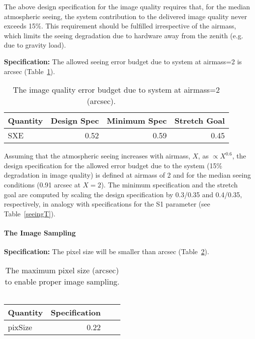 The above design specification for the image quality
requires that, for the median atmospheric seeing, the system
contribution to the delivered image quality never exceeds 15\%.
This requirement should be fulfilled irrespective of the airmass,
which limits the seeing degradation due to hardware away from the
zenith (e.g. due to gravity load).

\textbf{Specification:}
The allowed seeing error budget due to system at airmass=2 is
arcsec (Table~\ref{SXEtable}).

\begin{table}[h]
\begin{tabular}{|l|r|r|r|}
\hline
        Quantity  &  Design Spec & Minimum Spec & Stretch Goal \\
\hline
            SXE      &        0.52       &        0.59           &        0.45     \\
\hline
\end{tabular}
\caption{The image quality error budget due to system at airmass=2 (arcsec).  \,\,\,\,\,\,\,\, \,\,\,\,\,\,\,\,\,\,\,}
\label{SXEtable}
\end{table}

Assuming that the atmospheric seeing increases with airmass, $X$, as $\propto X^{0.6}$,
the design specification for the allowed error budget due to the system (15\% degradation in image quality)
is defined at airmass of 2 and for the median seeing conditions (0.91 arcsec at $X=2$). The minimum specification
and the stretch goal are computed by scaling the design specification by 0.3/0.35 and 0.4/0.35,
respectively, in analogy with specifications for the S1 parameter (see Table~\ref{seeingT}).





\paragraph{The Image Sampling\\}

\textbf{Specification:} The pixel size will be smaller than
 arcsec (Table~\ref{pixSize}).
\begin{table}[h]
\begin{tabular}{|l|r|r|r|}
\hline
        Quantity  & Specification \\
\hline
       pixSize     &        0.22      \\
\hline
\end{tabular}
\caption{The maximum pixel size (arcsec) to enable proper image sampling. \,\,\,\,\,\,\,\,\,\,\,\,\,\, \,\,\,\,\,\,\,\, }
\label{pixSize}
\end{table}

